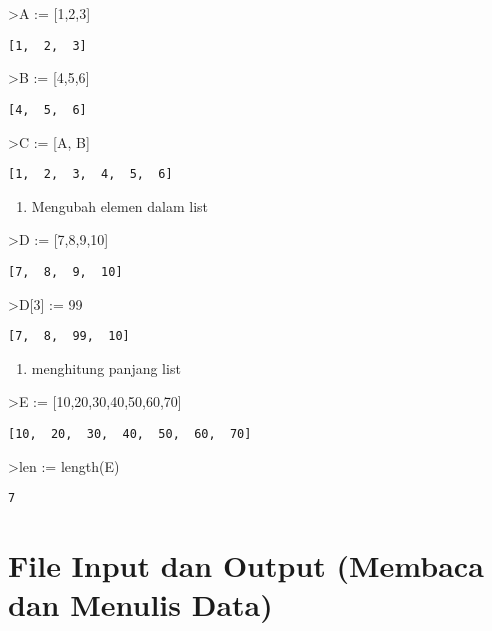 \documentclass[
]{book}
\providecommand{\tightlist}{%
  \setlength{\itemsep}{0pt}\setlength{\parskip}{0pt}}
\begin{document}
\textgreater A := {[}1,2,3{]}

\begin{verbatim}
[1,  2,  3]
\end{verbatim}

\textgreater B := {[}4,5,6{]}

\begin{verbatim}
[4,  5,  6]
\end{verbatim}

\textgreater C := {[}A, B{]}

\begin{verbatim}
[1,  2,  3,  4,  5,  6]
\end{verbatim}

\begin{enumerate}
\def\labelenumi{\arabic{enumi}.}
\setcounter{enumi}{2}
\tightlist
\item
  Mengubah elemen dalam list
\end{enumerate}

\textgreater D := {[}7,8,9,10{]}

\begin{verbatim}
[7,  8,  9,  10]
\end{verbatim}

\textgreater D{[}3{]} := 99

\begin{verbatim}
[7,  8,  99,  10]
\end{verbatim}

\begin{enumerate}
\def\labelenumi{\arabic{enumi}.}
\setcounter{enumi}{3}
\tightlist
\item
  menghitung panjang list
\end{enumerate}

\textgreater E := {[}10,20,30,40,50,60,70{]}

\begin{verbatim}
[10,  20,  30,  40,  50,  60,  70]
\end{verbatim}

\textgreater len := length(E)

\begin{verbatim}
7
\end{verbatim}

\chapter{File Input dan Output (Membaca dan Menulis Data)}\label{file-input-dan-output-membaca-dan-menulis-data}
\end{document}

